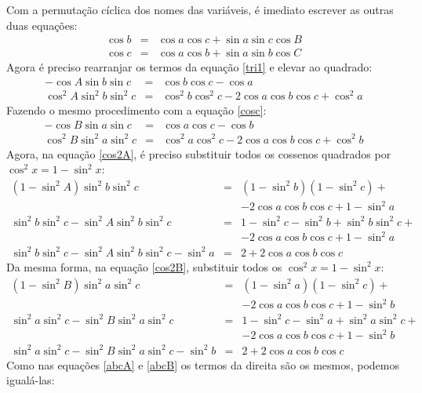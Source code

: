 Com a permutação cíclica dos nomes das variáveis, é imediato escrever as outras duas equações:
\begin{eqnarray}
\cos b &=& \cos a \cos c + \sin a \sin c \cos B \label{cosb} \\
\cos c &=& \cos a \cos b + \sin a \sin b \cos C \label{cosc}
\end{eqnarray}
%
Agora é preciso rearranjar os termos da equação \ref{tri1} e elevar ao quadrado:
\begin{eqnarray}
-\cos A \sin b \sin c &=&  \cos b \cos c - \cos a \\
\cos^2 A \sin^2 b \sin^2 c &=&  \cos^2 b \cos^2 c - 2 \cos a \cos b \cos c + \cos^2 a \label{cos2A}
\end{eqnarray}
%
Fazendo o mesmo procedimento com a equação \ref{cosc}:
\begin{eqnarray}
-\cos B \sin a \sin c &=&  \cos a \cos c - \cos b \\
\cos^2 B \sin^2 a \sin^2 c &=&  \cos^2 a \cos^2 c - 2 \cos a \cos b \cos c + \cos^2 b \label{cos2B}
\end{eqnarray}
%
Agora, na equação \ref{cos2A}, é preciso substituir todos os cossenos quadrados por $\cos^2 x = 1 - \sin^2 x$:
%
\begin{eqnarray}
(1 - \sin^2 A) \sin^2 b \sin^2 c &=&  (1-\sin^2 b) (1-\sin^2 c) + \\ && - 2 \cos a \cos b \cos c + 1 - \sin^2 a \\
\sin^2 b \sin^2 c - \sin^2 A \sin^2 b \sin^2 c &=& 1-\sin^2 c - \sin^2 b + \sin^2 b \sin^2 c + \\ && - 2 \cos a \cos b \cos c + 1 - \sin^2 a \\
\sin^2 b \sin^2 c - \sin^2 A \sin^2 b \sin^2 c - \sin^2 a &=& 2 + 2 \cos a \cos b \cos c \label{abcA}
\end{eqnarray}
%
Da mesma forma, na equação \ref{cos2B}, substituir todos os $\cos^2 x = 1 - \sin^2 x$:
%
\begin{eqnarray}
(1 - \sin^2 B) \sin^2 a \sin^2 c &=&  (1-\sin^2 a) (1-\sin^2 c) + \\ && - 2 \cos a \cos b \cos c + 1 - \sin^2 b \\
\sin^2 a \sin^2 c - \sin^2 B \sin^2 a \sin^2 c &=& 1-\sin^2 c - \sin^2 a + \sin^2 a \sin^2 c + \\ && - 2 \cos a \cos b \cos c + 1 - \sin^2 b \\
\sin^2 a \sin^2 c - \sin^2 B \sin^2 a \sin^2 c - \sin^2 b &=& 2 + 2 \cos a \cos b \cos c \label{abcB}
\end{eqnarray}
%
Como nas equações \ref{abcA} e \ref{abcB} os termos da direita são os mesmos, podemos igualá-las:

